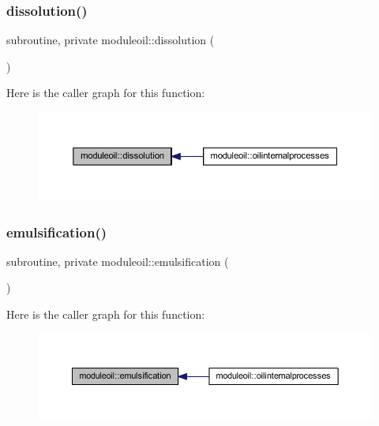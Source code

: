 \subsubsection{\texorpdfstring{dissolution()}{dissolution()}}
{\footnotesize\ttfamily subroutine, private moduleoil\+::dissolution (\begin{DoxyParamCaption}{ }\end{DoxyParamCaption})\hspace{0.3cm}{\ttfamily [private]}}

Here is the caller graph for this function\+:\nopagebreak
\begin{figure}[H]
\begin{center}
\leavevmode
\includegraphics[width=350pt]{namespacemoduleoil_a1eb8385a1fb72338d92a438deda6ddb1_icgraph}
\end{center}
\end{figure}
\mbox{\label{namespacemoduleoil_ab22a55bb01358e1000d700bd0b2eebe3}} 
\subsubsection{\texorpdfstring{emulsification()}{emulsification()}}
{\footnotesize\ttfamily subroutine, private moduleoil\+::emulsification (\begin{DoxyParamCaption}{ }\end{DoxyParamCaption})\hspace{0.3cm}{\ttfamily [private]}}

Here is the caller graph for this function\+:\nopagebreak
\begin{figure}[H]
\begin{center}
\leavevmode
\includegraphics[width=350pt]{namespacemoduleoil_ab22a55bb01358e1000d700bd0b2eebe3_icgraph}
\end{center}
\end{figure}
\mbox{\label{namespacemoduleoil_a057ec48dbb4ce23ac0814ed1bdc90cc4}} 
